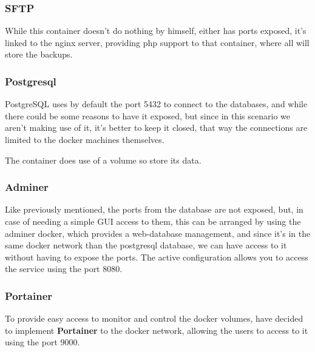     \subsubsection[PHP]{SFTP}
    \begin{flushleft}
        While this container doesn't do nothing by himself, either has ports exposed, it's linked to the nginx server, providing php support
        to that container, where all will store the backups.
    \end{flushleft}

    \subsubsection[Postgresql]{Postgresql}
    \begin{flushleft}
        PostgreSQL uses by default the port 5432 to connect to the databases, and while there could be some reasons to
        have it exposed, but since in this scenario we aren't making use of it, it's better to keep it closed, that way
        the connections are limited to the docker machines themselves.
    \end{flushleft}
    \begin{flushleft}
        The container does use of a volume so store its data.
    \end{flushleft}
    \newpage
    \subsubsection[Adminer]{Adminer}
    \begin{flushleft}
        Like previously mentioned, the ports from the database are not exposed, but, in case of needing a simple GUI
        access to them, this can be arranged by using the adminer docker, which provides a web-database management,
        and since it's in the same docker network than the postgresql database, we can have access to it without having
        to expose the ports.
        The active configuration allows you to access the service using the port 8080.
    \end{flushleft}

    \subsubsection[Portainer]{Portainer}
    \begin{flushleft}
        To provide easy access to monitor and control the docker volumes, have decided to implement \textbf{Portainer}
        to the docker network, allowing the users to access to it using the port 9000.
    \end{flushleft}


